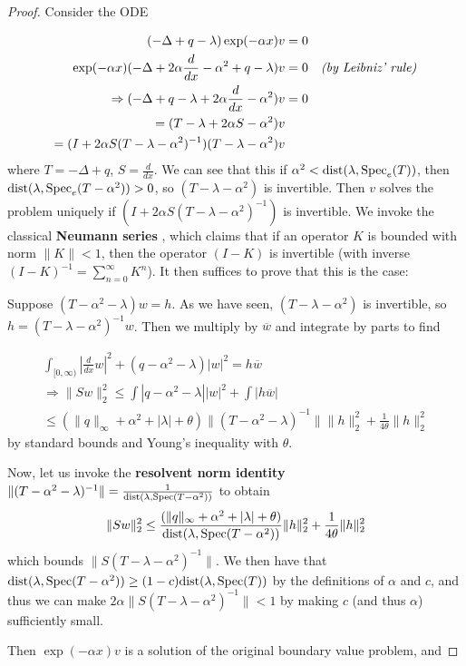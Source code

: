 \documentclass[../main.tex]{subfiles}
\begin{document}
\begin{proof}
Consider the ODE

\begin{align*}
(-\Delta + q - \lambda)\exp(- \alpha x)v & = 0 & \\
\exp(- \alpha x)(-\Delta + 2 \alpha\frac{d}{dx} - \alpha^2 + q - \lambda)v & = 0 & \text{\emph{(by Leibniz' rule)}} \\
\Rightarrow (-\Delta + q - \lambda + 2 \alpha\frac{d}{dx} - \alpha^2 )v & = 0 & \\
= (T - \lambda + 2 \alpha S - \alpha^2 )v && \\
= (I + 2 \alpha S(T - \lambda - \alpha^2)^{-1})(T - \lambda - \alpha^2)v
\end{align*}
where $T = -\Delta + q$, $S = \frac{d}{dx}$.
We can see that this if $\alpha^2 < \mathrm{dist}(\lambda, \mathrm{Spec}_e(T))$, then $\mathrm{dist}(\lambda, \mathrm{Spec}_e(T - \alpha^2)) > 0$, so $(T - \lambda - \alpha^2)$ is invertible. Then $v$ solves the problem uniquely if $(I + 2 \alpha S(T - \lambda - \alpha^2)^{-1})$ is invertible. We invoke the classical \textbf{Neumann series} \cite{arveson2002short}, which claims that if an operator $K$ is bounded with norm $\|K\|<1$, then the operator $(I - K)$ is invertible (with inverse $(I - K)^{-1} = \sum_{n=0}^\infty K^n$). It then suffices to prove that this is the case:

Suppose $(T - \alpha^2 - \lambda)w = h$. As we have seen, $(T - \lambda - \alpha^2)$ is invertible, so $h = (T - \lambda - \alpha^2)^{-1}w$. Then we multiply by $\overline{w}$ and integrate by parts to find

\begin{align*}
 \int_{[0, \infty)}|\frac{d}{dx}w|^2 + (q - \alpha^2 - \lambda)|w|^2 = h\overline{w} \\
\Rightarrow \|Sw\|^2_2 \leq \int |q - \alpha^2 - \lambda||w|^2 + \int |h\overline{w}| \\
\leq (\|q\|_\infty + \alpha^2 + |\lambda| + \theta)\|(T - \alpha^2 - \lambda)^{-1}\|\|h\|^2_2 + \frac{1}{4\theta} \|h\|^2_2 
\end{align*}
by standard bounds and Young's inequality with $\theta$.

Now, let us invoke the \textbf{resolvent norm identity} $\|(T - \alpha^2 - \lambda)^{-1}\| = \frac{1}{\mathrm{dist}(\lambda, \mathrm{Spec}(T- \alpha^2))}$ to obtain 
$$\|Sw\|^2_2 \leq \frac{(\|q\|_\infty + \alpha^2 + |\lambda| + \theta)}{\mathrm{dist}(\lambda, \mathrm{Spec}(T- \alpha^2))}\|h\|^2_2 + \frac{1}{4\theta} \|h\|^2_2 $$
which bounds $\|S(T - \lambda - \alpha^2)^{-1}\|$. We then have that $\mathrm{dist}(\lambda, \mathrm{Spec}(T- \alpha^2)) \geq (1-c)\mathrm{dist}(\lambda, \mathrm{Spec}(T))$ by the definitions of $\alpha$ and $c$, and thus we can make $2 \alpha \|S(T - \lambda - \alpha^2)^{-1}\| < 1$ by making $c$ (and thus $\alpha$) sufficiently small.

Then $\exp(- \alpha x)v$ is a solution of the original boundary value problem, and 
\end{proof}
\end{document}
